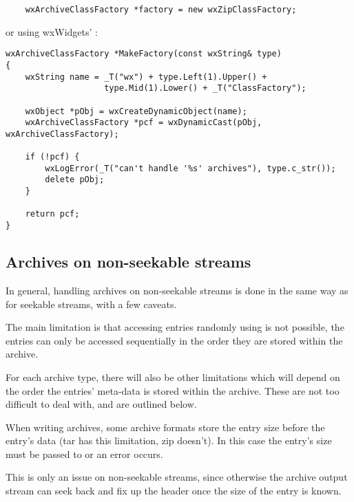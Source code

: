 \begin{verbatim}
    wxArchiveClassFactory *factory = new wxZipClassFactory;

\end{verbatim}

or using wxWidgets' :

\begin{verbatim}
wxArchiveClassFactory *MakeFactory(const wxString& type)
{
    wxString name = _T("wx") + type.Left(1).Upper() +
                    type.Mid(1).Lower() + _T("ClassFactory");

    wxObject *pObj = wxCreateDynamicObject(name);
    wxArchiveClassFactory *pcf = wxDynamicCast(pObj, wxArchiveClassFactory);

    if (!pcf) {
        wxLogError(_T("can't handle '%s' archives"), type.c_str());
        delete pObj;
    }

    return pcf;
}

\end{verbatim}


\subsection{Archives on non-seekable streams}\label{wxarcnoseek}


In general, handling archives on non-seekable streams is done in the same
way as for seekable streams, with a few caveats.

The main limitation is that accessing entries randomly using
is not possible, the entries can only be accessed sequentially in the order 
they are stored within the archive.

For each archive type, there will also be other limitations which will
depend on the order the entries' meta-data is stored within the archive.
These are not too difficult to deal with, and are outlined below.


When writing archives, some archive formats store the entry size before
the entry's data (tar has this limitation, zip doesn't). In this case
the entry's size must be passed to
  or an error
occurs.

This is only an issue on non-seekable streams, since otherwise the archive
output stream can seek back and fix up the header once the size of the
entry is known.

